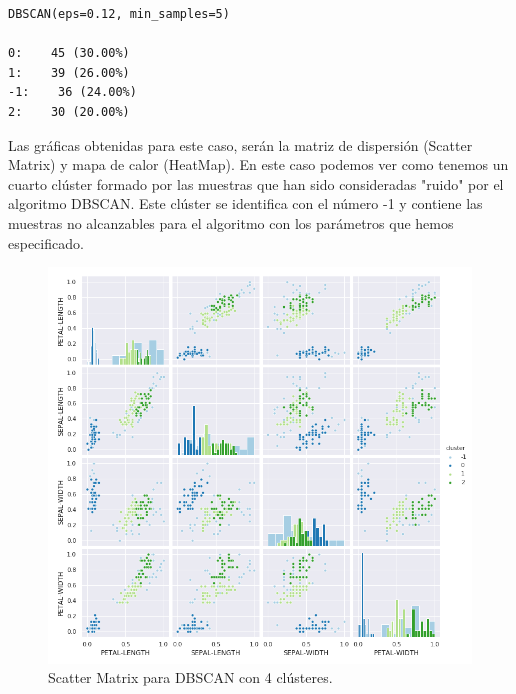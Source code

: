 \documentclass[a4paper, 20pt]{article}
\begin{document}
\begin{lstlisting}
DBSCAN(eps=0.12, min_samples=5)

0:    45 (30.00%)
1:    39 (26.00%)
-1:    36 (24.00%)
2:    30 (20.00%)
\end{lstlisting}

Las gráficas obtenidas para este caso, serán la matriz de dispersión (Scatter Matrix) y mapa de calor (HeatMap). En este caso podemos ver como tenemos un cuarto clúster formado por las muestras que han sido consideradas "ruido" por el algoritmo DBSCAN. Este clúster se identifica con el número -1 y contiene las muestras no alcanzables para el algoritmo con los parámetros que hemos especificado.

\begin{figure}[h]
\centering
\includegraphics[scale=0.62]{dani/scatmatrixDBSCANIRIS.png}
\caption{Scatter Matrix para DBSCAN con 4 clústeres.}
\label{smdb}
\end{figure}

\clearpage
\end{document}
